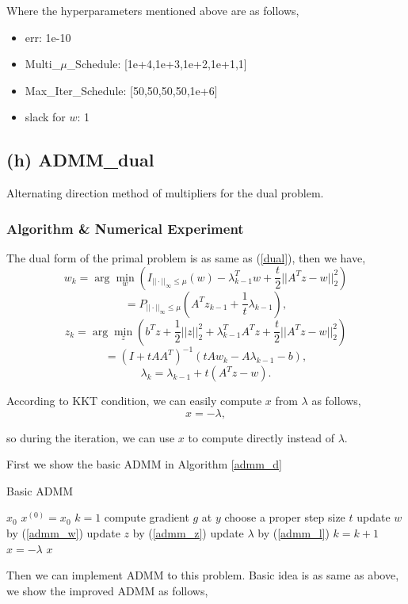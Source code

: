 \documentclass[]{article}
\begin{document}
Where the hyperparameters mentioned above are as follows,

\begin{itemize}
	\item err: 1e-10
	\item Multi\_$\mu$\_Schedule: [1e+4,1e+3,1e+2,1e+1,1]
	\item Max\_Iter\_Schedule: [50,50,50,50,1e+6]
	\item slack for $w$: 1
\end{itemize}



\subsection{(h) ADMM\_dual}
\noindent
Alternating direction method of multipliers for the dual problem.

\subsubsection{Algorithm \& Numerical Experiment}

The dual form of the primal problem is as same as (\ref{dual}), then we have,
$$w_k = \arg\min_{w}(I_{||\cdot||_{\infty}\leq \mu}(w)-\lambda_{k-1}^Tw+\frac{t}{2}||A^Tz-w||_2^2)$$
\begin{equation}\label{admm_w}
	= P_{||\cdot||_{\infty}\leq \mu}(A^Tz_{k-1}+\frac{1}{t}\lambda_{k-1}),
\end{equation}
$$z_k = \arg\min_{z}(b^Tz+\frac{1}{2}||z||_2^2 + \lambda_{k-1}^TA^Tz+\frac{t}{2}||A^Tz-w||_2^2)$$
\begin{equation}\label{admm_z}
= (I+tAA^T)^{-1}(tAw_k-A\lambda_{k-1}-b),
\end{equation}
\begin{equation}\label{admm_l}
	\lambda_k = \lambda_{k-1} + t(A^Tz-w).
\end{equation}


According to KKT condition, we can easily compute $x$ from $\lambda$ as follows,
\begin{equation}
	x = -\lambda,
\end{equation}

so during the iteration, we can use $x$ to compute directly instead of $\lambda$.

First we show the basic ADMM in Algorithm \ref{admm_d}


\begin{algorithm}[!h]
	\caption{Basic ADMM}
	\label{admm_d}
	\begin{algorithmic}
		\REQUIRE $x_0$
		\STATE $x^{(0)}=x_0$
		\STATE $k=1$
		\STATE compute gradient $g$ at $y$
		\STATE choose a proper step size $t$
		\STATE update $w$ by (\ref{admm_w})
		\STATE update $z$ by (\ref{admm_z})
		\STATE update $\lambda$ by (\ref{admm_l})
		\STATE $k=k+1$
		\ENDWHILE
		\STATE $x = -\lambda$
		\ENSURE $x$
	\end{algorithmic}
\end{algorithm}
Then we can implement ADMM to this problem. Basic idea is as same as above, we show the improved ADMM as follows,
\end{document}
